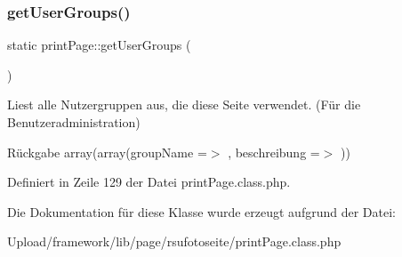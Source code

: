 \subsubsection{\texorpdfstring{get\+User\+Groups()}{getUserGroups()}}
{\footnotesize\ttfamily static print\+Page\+::get\+User\+Groups (\begin{DoxyParamCaption}{ }\end{DoxyParamCaption})\hspace{0.3cm}{\ttfamily [static]}}

Liest alle Nutzergruppen aus, die diese Seite verwendet. (Für die Benutzeradministration) \begin{DoxyReturn}{Rückgabe}
array(array(\textquotesingle{}group\+Name\textquotesingle{} =$>$ \textquotesingle{}\textquotesingle{}, \textquotesingle{}beschreibung\textquotesingle{} =$>$ \textquotesingle{}\textquotesingle{})) 
\end{DoxyReturn}


Definiert in Zeile 129 der Datei print\+Page.\+class.\+php.



Die Dokumentation für diese Klasse wurde erzeugt aufgrund der Datei\+:\begin{DoxyCompactItemize}
\item 
Upload/framework/lib/page/rsufotoseite/print\+Page.\+class.\+php\end{DoxyCompactItemize}
